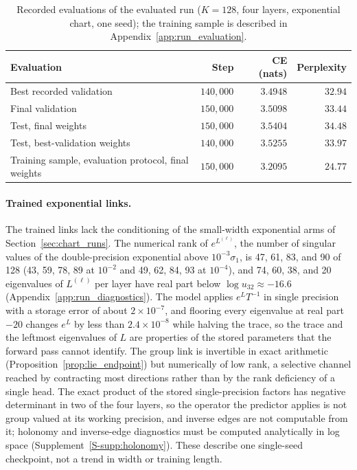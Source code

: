\documentclass[twoside,11pt]{article}
\begin{document}
\begin{table}[t]
\centering
\begin{tabular}{lrrr}
\toprule
Evaluation & Step & CE (nats) & Perplexity \\
\midrule
Best recorded validation & $140{,}000$ & $3.4948$ & $32.94$ \\ %
Final validation & $150{,}000$ & $3.5098$ & $33.44$ \\ %
Test, final weights & $150{,}000$ & $3.5404$ & $34.48$ \\ %
Test, best-validation weights & $140{,}000$ & $3.5255$ & $33.97$ \\ %
Training sample, evaluation protocol, final weights & $150{,}000$ & $3.2095$ & $24.77$ \\ %
\bottomrule
\end{tabular}
\caption{Recorded evaluations of the evaluated run ($K=128$, four layers, exponential chart, one seed); the training sample is described in Appendix~\ref{app:run_evaluation}.}
\label{tab:anchor_run}
\end{table}

\paragraph{Trained exponential links.}
\label{sec:trained_links}
The trained links lack the conditioning of the small-width exponential arms of Section~\ref{sec:chart_runs}. The numerical rank of $e^{L^{(\ell)}}$, the number of singular values of the double-precision exponential above $10^{-3}\sigma_1$, is 47, 61, 83, and 90 of 128 (43, 59, 78, 89 at $10^{-2}$ and 49, 62, 84, 93 at $10^{-4}$), and 74, 60, 38, and 20 eigenvalues of $L^{(\ell)}$ per layer have real part below $\log u_{32}\approx-16.6$ (Appendix~\ref{app:run_diagnostics}). The model applies $e^{L}T^{-1}$ in single precision with a storage error of about $2\times10^{-7}$, and flooring every eigenvalue at real part $-20$ changes $e^{L}$ by less than $2.4\times10^{-8}$ while halving the trace, so the trace and the leftmost eigenvalues of $L$ are properties of the stored parameters that the forward pass cannot identify. %
The group link is invertible in exact arithmetic (Proposition~\ref{prop:lie_endpoint}) but numerically of low rank, a selective channel reached by contracting most directions rather than by the rank deficiency of a single head. The exact product of the stored single-precision factors has negative determinant in two of the four layers, so the operator the predictor applies is not group valued at its working precision, and inverse edges are not computable from it; holonomy and inverse-edge diagnostics must be computed analytically in log space (Supplement~\ref{S-supp:holonomy}). These describe one single-seed checkpoint, not a trend in width or training length.
\end{document}
